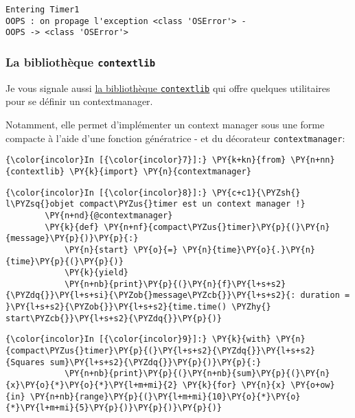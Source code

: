     \begin{Verbatim}[commandchars=\\\{\},frame=single,framerule=0.3mm,rulecolor=\color{cellframecolor}]
Entering Timer1
OOPS : on propage l'exception <class 'OSError'> - 
OOPS -> <class 'OSError'>
\end{Verbatim}

    \hypertarget{la-bibliothuxe8que-contextlib}{%
\subsubsection{\texorpdfstring{La bibliothèque
\texttt{contextlib}}{La bibliothèque contextlib}}\label{la-bibliothuxe8que-contextlib}}

    Je vous signale aussi
\href{https://docs.python.org/3/library/contextlib.html}{la bibliothèque
\texttt{contextlib}} qui offre quelques utilitaires pour se définir un
contextmanager.

Notamment, elle permet d'implémenter un context manager sous une forme
compacte à l'aide d'une fonction génératrice - et du décorateur
\texttt{contextmanager}:

    \begin{Verbatim}[commandchars=\\\{\},frame=single,framerule=0.3mm,rulecolor=\color{cellframecolor}]
{\color{incolor}In [{\color{incolor}7}]:} \PY{k+kn}{from} \PY{n+nn}{contextlib} \PY{k}{import} \PY{n}{contextmanager}
\end{Verbatim}


    \begin{Verbatim}[commandchars=\\\{\},frame=single,framerule=0.3mm,rulecolor=\color{cellframecolor}]
{\color{incolor}In [{\color{incolor}8}]:} \PY{c+c1}{\PYZsh{} l\PYZsq{}objet compact\PYZus{}timer est un context manager !}
        \PY{n+nd}{@contextmanager}
        \PY{k}{def} \PY{n+nf}{compact\PYZus{}timer}\PY{p}{(}\PY{n}{message}\PY{p}{)}\PY{p}{:}
            \PY{n}{start} \PY{o}{=} \PY{n}{time}\PY{o}{.}\PY{n}{time}\PY{p}{(}\PY{p}{)}
            \PY{k}{yield}
            \PY{n+nb}{print}\PY{p}{(}\PY{n}{f}\PY{l+s+s2}{\PYZdq{}}\PY{l+s+si}{\PYZob{}message\PYZcb{}}\PY{l+s+s2}{: duration = }\PY{l+s+s2}{\PYZob{}}\PY{l+s+s2}{time.time() \PYZhy{} start\PYZcb{}}\PY{l+s+s2}{\PYZdq{}}\PY{p}{)}
\end{Verbatim}


    \begin{Verbatim}[commandchars=\\\{\},frame=single,framerule=0.3mm,rulecolor=\color{cellframecolor}]
{\color{incolor}In [{\color{incolor}9}]:} \PY{k}{with} \PY{n}{compact\PYZus{}timer}\PY{p}{(}\PY{l+s+s2}{\PYZdq{}}\PY{l+s+s2}{Squares sum}\PY{l+s+s2}{\PYZdq{}}\PY{p}{)}\PY{p}{:}
            \PY{n+nb}{print}\PY{p}{(}\PY{n+nb}{sum}\PY{p}{(}\PY{n}{x}\PY{o}{*}\PY{o}{*}\PY{l+m+mi}{2} \PY{k}{for} \PY{n}{x} \PY{o+ow}{in} \PY{n+nb}{range}\PY{p}{(}\PY{l+m+mi}{10}\PY{o}{*}\PY{o}{*}\PY{l+m+mi}{5}\PY{p}{)}\PY{p}{)}\PY{p}{)}
\end{Verbatim}


